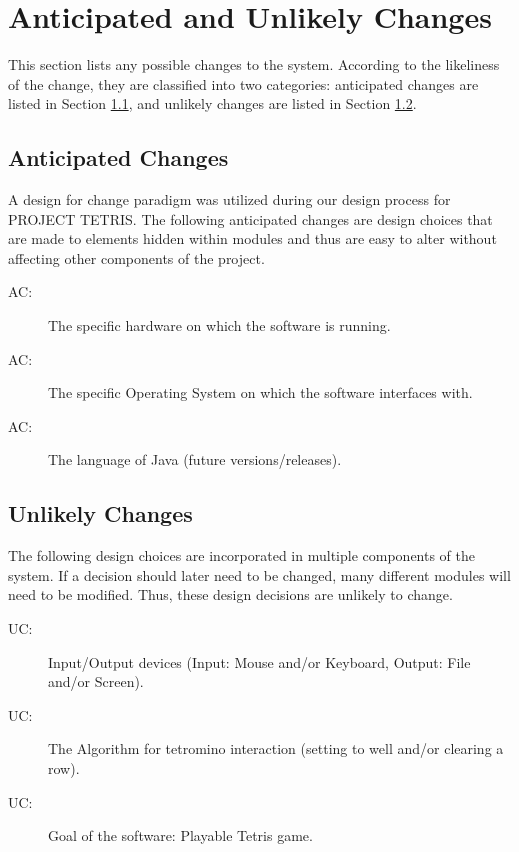 \documentclass[12pt, titlepage]{article}
\newcounter{acnum}
\newcommand{\actheacnum}{AC\theacnum}
\newcounter{ucnum}
\newcommand{\uctheucnum}{UC\theucnum}
\begin{document}
\section{Anticipated and Unlikely Changes} \label{SecChange}
This section lists any possible changes to the system. According to the likeliness
of the change, they are classified into two
categories: anticipated changes are listed in Section \ref{SecAchange}, and
unlikely changes are listed in Section \ref{SecUchange}.
\subsection{Anticipated Changes} \label{SecAchange}
A design for change paradigm was utilized during our design process for PROJECT TETRIS.
The following anticipated changes are design choices that are made to elements hidden within 
modules and thus are easy to alter without affecting other components of the project.
\begin{description}
\item[ \actheacnum \label{acHardware}:] The specific
  hardware on which the software is running.
\item[ \actheacnum \label{acOS}:] The specific
  Operating System on which the software interfaces with.
\item[ \actheacnum \label{acJava}:] The language
  of Java (future versions/releases).
\end{description}
\subsection{Unlikely Changes} \label{SecUchange}
The following design choices are incorporated in multiple components of the system. If
a decision should later need to be changed, many different modules will need to be 
modified. Thus, these design decisions are unlikely to change.
\begin{description}
\item[ \uctheucnum \label{ucIO}:] Input/Output devices
  (Input: Mouse and/or Keyboard, Output: File and/or Screen).
\item[ \uctheucnum \label{ucAlgorithm}:] The Algorithm
  for tetromino interaction (setting to well and/or clearing a row).
\item[ \uctheucnum \label{ucGoal}:] Goal of the software:
  Playable Tetris game.
\end{description}
\end{document}
